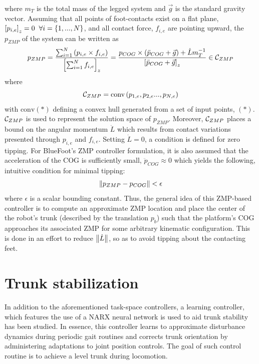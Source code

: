		where $m_{T}$ is the total mass of the legged system and $\vec{g}$ is the standard gravity vector. Assuming that all points of foot-contacts exist on a flat plane, \IE $\left[p_{i,e}\right]_{z}=0\hspace{2mm} \forall i=\{1,...,N\}$, and all contact force, $f_{i,e}$ are pointing upward, the $p_{ZMP}$ of the system can be written as
			\begin{equation}
				p_{ZMP} 
				= 
				\frac{ \sum_{i=1}^{N} \left( p_{i,e} \times f_{i,e} \right) }{ \left[\sum_{i=1}^{N} f_{i,e}\right]_{z} }
				= 
				\frac{ 	p_{COG} \times \left( \ddot{p}_{COG} + \vec{g} \right) + \dot{L}m_{T}^{-1} }{ \left[ \ddot{p}_{COG} + \vec{g} \right]_{z}}
				\in {\cal C}_{ZMP} 
			\end{equation}
		where
			\begin{equation}
				{\cal C}_{ZMP} = \text{conv}\left(p_{1,e},p_{2,e}...,p_{N,e}\right)
			\end{equation}
		with $\text{conv}(*)$ defining a convex hull generated from a set of input points, $(*)$. ${\cal C}_{ZMP}$ is used to represent the solution space of $p_{ZMP}$. Moreover, ${\cal C}_{ZMP}$ places a bound on the angular momentum $\dot{L}$ which results from contact variations presented through $p_{i,e}$ and $f_{i,e}$. Setting $\dot{L}=0$, a condition is defined for zero tipping. For BlueFoot's ZMP controller formulation, it is also assumed that the acceleration of the COG is sufficiently small, \IE $\ddot{p}_{COG}\approx0$ which yields the following, intuitive condition for minimal tipping:
			\begin{equation}
				\left\lVert p_{ZMP} - p_{COG}\right\rVert < \epsilon
			\end{equation}
		where $\epsilon$ is a scalar bounding constant. Thus, the general idea of this ZMP-based controller is to compute an approximate ZMP location and place the center of the robot's trunk (described by the translation $p_{b}$) such that the platform's COG approaches its associated ZMP for some arbitrary kinematic configuration. This is done in an effort to reduce $\left\lVert\dot{L}\right\rVert$, so as to avoid tipping about the contacting feet.







	\section{Trunk stabilization}

		In addition to the aforementioned task-space controllers, a learning controller, which features the use of a NARX neural network is used to aid trunk stability has been studied. In essence, this controller learns to approximate disturbance dynamics during periodic gait routines and corrects trunk orientation by administering adaptations to joint position controls. The goal of such control routine is to achieve a level trunk during locomotion.
		
